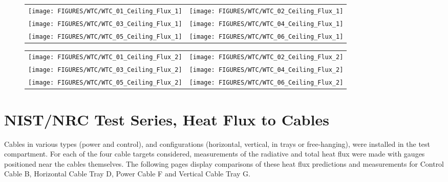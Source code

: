 \begin{figure}[p]
\begin{tabular*}{\textwidth}{l@{\extracolsep{\fill}}r}
\texttt{[image: FIGURES/WTC/WTC\_01\_Ceiling\_Flux\_1]} &
\texttt{[image: FIGURES/WTC/WTC\_02\_Ceiling\_Flux\_1]} \\
\texttt{[image: FIGURES/WTC/WTC\_03\_Ceiling\_Flux\_1]} &
\texttt{[image: FIGURES/WTC/WTC\_04\_Ceiling\_Flux\_1]} \\
\texttt{[image: FIGURES/WTC/WTC\_05\_Ceiling\_Flux\_1]} &
\texttt{[image: FIGURES/WTC/WTC\_06\_Ceiling\_Flux\_1]}
\end{tabular*}
\label{NIST_WTC_Ceiling_Flux_1}
\end{figure}

\begin{figure}[p]
\begin{tabular*}{\textwidth}{l@{\extracolsep{\fill}}r}
\texttt{[image: FIGURES/WTC/WTC\_01\_Ceiling\_Flux\_2]} &
\texttt{[image: FIGURES/WTC/WTC\_02\_Ceiling\_Flux\_2]} \\
\texttt{[image: FIGURES/WTC/WTC\_03\_Ceiling\_Flux\_2]} &
\texttt{[image: FIGURES/WTC/WTC\_04\_Ceiling\_Flux\_2]} \\
\texttt{[image: FIGURES/WTC/WTC\_05\_Ceiling\_Flux\_2]} &
\texttt{[image: FIGURES/WTC/WTC\_06\_Ceiling\_Flux\_2]}
\end{tabular*}
\label{NIST_WTC_Ceiling_Flux_2}
\end{figure}




\clearpage

\section{NIST/NRC Test Series, Heat Flux to Cables}

Cables in various types (power and control), and configurations (horizontal, vertical, in trays or free-hanging), were installed in
the test compartment. For each of the four cable targets considered, measurements of the radiative and total heat flux were made with
gauges positioned near the cables themselves.  The following pages display comparisons of these heat flux predictions and measurements for
Control Cable B, Horizontal Cable Tray D, Power Cable F and Vertical Cable Tray G.

\newpage

